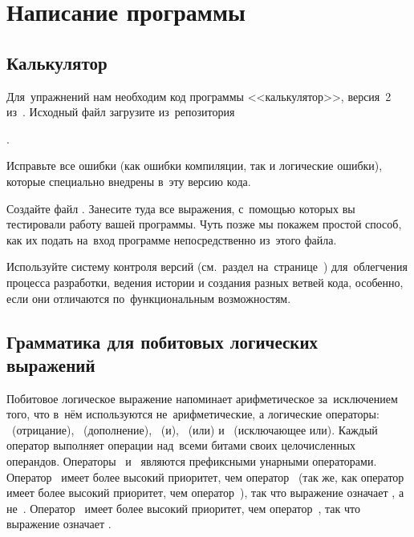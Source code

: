 
\chapter{Написание программы}

\section{Калькулятор}
Для~упражнений нам необходим код программы <<калькулятор>>, версия~2 из~. Исходный файл загрузите из~репозитория
\begin{center}
  .
\end{center}

Исправьте все ошибки (как ошибки компиляции, так и логические ошибки), которые специально внедрены в~эту версию кода.

Создайте файл . Занесите туда все выражения, с~помощью которых вы тестировали работу вашей программы. Чуть позже мы покажем простой способ, как их подать на~вход программе непосредственно из~этого файла.

Используйте систему контроля версий (см.~раздел на~странице~\pageref{sect:git}) для~облегчения процесса разработки, ведения истории и создания разных ветвей кода, особенно, если они отличаются по~функциональным возможностям.



\section{Грамматика для побитовых логических выражений}
Побитовое логическое выражение напоминает арифметическое за~исключением того, что в~нём используются не~арифметические, а логические операторы: \cppinline{!}~(отрицание), \cppinline{~}~(дополнение), \cppinline{&}~(и), \cppinline{|}~(или) и \cppinline{^}~(исключающее или). Каждый оператор выполняет операции над~всеми битами своих целочисленных операндов. Операторы~\cppinline{!} и~\cppinline{~} являются префиксными унарными операторами. Оператор~\cppinline{^} имеет более высокий приоритет, чем оператор~\cppinline{|} (так же, как оператор~\cppinline{*} имеет более высокий приоритет, чем оператор~\cppinline{+}), так что выражение  означает , а не~. Оператор~\cppinline{&} имеет более высокий приоритет, чем оператор~\cppinline{^}, так что выражение  означает .

